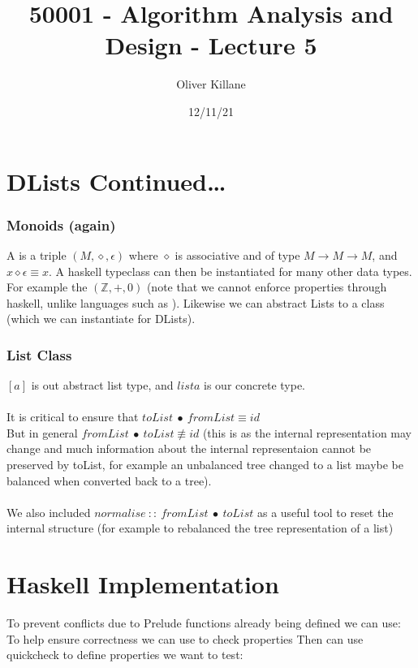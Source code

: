 \documentclass{report}
\title{50001 - Algorithm Analysis and Design - Lecture 5}
\author{Oliver Killane}
\date{12/11/21}
\begin{document}
\maketitle
{}

\section*{DLists Continued\dots}
\subsubsection*{Monoids (again)}
A  is a triple $(M, \diamond, \epsilon)$ where $\diamond$ is associative and of type $M \to M \to M$, and $x \diamond \epsilon \equiv x$.
A haskell typeclass can then be instantiated for many other data types. For example the  $(\mathbb{Z}, +, 0)$ (note that we cannot enforce  properties through haskell, unlike languages such as ).
Likewise we can abstract Lists to a class (which we can instantiate for DLists).

\subsubsection*{List Class}
$[a]$ is out abstract list type, and $list a$ is our concrete type.
\\
\\ It is critical to ensure that $toList \ \bullet \ fromList \equiv id$
\\ But in general $fromList \ \bullet \ toList \not\equiv id$ (this is as the internal representation may change
and much information about the internal representaion cannot be preserved by toList, for example an unbalanced tree
changed to a list maybe be balanced when converted back to a tree).
\\
\\ We also included $normalise \ :: \ fromList \ \bullet \ toList$ as a useful tool to reset the internal structure (for example to rebalanced the tree representation of a list)

\section*{Haskell Implementation}
To prevent conflicts due to Prelude functions already being defined we can use:
To help ensure correctness we can use  to check properties
Then can use quickcheck to define properties we want to test:
\end{document}
